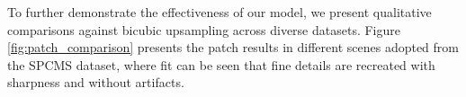 \documentclass[11pt]{article}
\begin{document}
To further demonstrate the effectiveness of our model, we present qualitative comparisons against bicubic upsampling across diverse datasets. Figure \ref{fig:patch_comparison} presents the patch results in different scenes adopted from the SPCMS\cite{tao2017spmc} dataset, where fit can be seen that fine details are recreated with sharpness and without artifacts.



\begin{figure*}
    \centering
    \\

    \\


\end{figure*}
\end{document}
